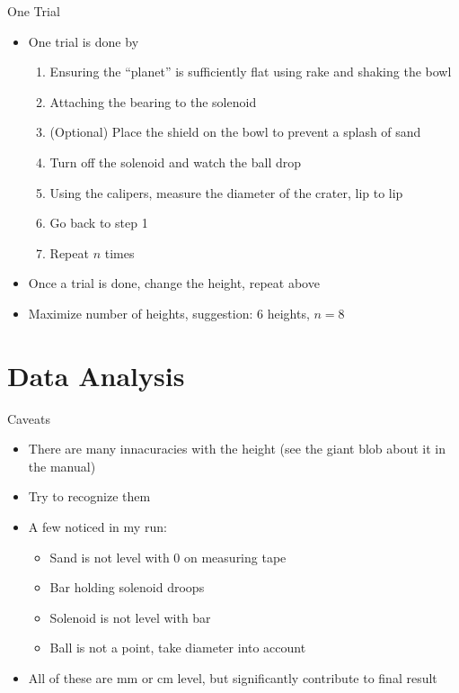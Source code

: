 \documentclass{beamer}
\begin{document}
\begin{frame}{One Trial}
  \begin{itemize}
  \item One trial is done by
    \begin{enumerate}
    \item Ensuring the ``planet'' is sufficiently flat using rake and shaking the bowl
    \item Attaching the bearing to the solenoid
    \item (Optional) Place the shield on the bowl to prevent a splash of sand
    \item Turn off the solenoid and watch the ball drop
    \item Using the calipers, measure the diameter of the crater, lip to lip
    \item Go back to step 1
    \item Repeat $n$ times
    \end{enumerate}
  \item Once a trial is done, change the height, repeat above
  \item Maximize number of heights, suggestion: 6 heights, $n=8$
  \end{itemize}
\end{frame}

\section{Data Analysis}
\begin{frame}{Caveats}
  \begin{itemize}
  \item There are many innacuracies with the height (see the giant blob about it in the manual)
  \item Try to recognize them
  \item A few noticed in my run:
    \begin{itemize}
    \item Sand is not level with $0$ on measuring tape
    \item Bar holding solenoid droops
    \item Solenoid is not level with bar
    \item Ball is not a point, take diameter into account
    \end{itemize}
  \item All of these are mm or cm level, but significantly contribute to final result
  \end{itemize}
\end{frame}
\end{document}
